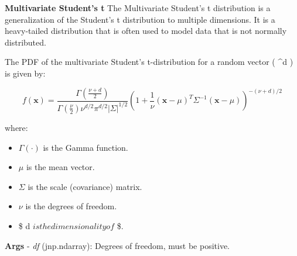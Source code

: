 \documentclass[
  letterpaper,
  DIV=11,
  numbers=noendperiod]{scrartcl}
\providecommand{\tightlist}{%
  \setlength{\itemsep}{0pt}\setlength{\parskip}{0pt}}\usepackage{longtable,booktabs,array}
\begin{document}
\textbf{Multivariate Student's t} The Multivariate Student's t
distribution is a generalization of the Student's t distribution to
multiple dimensions. It is a heavy-tailed distribution that is often
used to model data that is not normally distributed.

The PDF of the multivariate Student's t-distribution for a random vector
(  \in {}\^{}d ) is given by:

\[
  f(\mathbf{x}) = \frac{\Gamma\left(\frac{\nu + d}{2}\right)}{\Gamma\left(\frac{\nu}{2}\right) \nu^{d/2} \pi^{d/2} | \Sigma|^{1/2}} \left(1 + \frac{1}{\nu} (\mathbf{x} - \mu)^T \Sigma^{-1} (\mathbf{x} - \mu)\right)^{-(\nu + d)/2}
  \]

where:

\begin{itemize}
\tightlist
\item
  \(\Gamma(\cdot)\) is the Gamma function.
\item
  \(\mu\) is the mean vector.
\item
  \(\Sigma\) is the scale (covariance) matrix.
\item
  \(\nu\) is the degrees of freedom.
\item
  \$ d \(is the dimensionality of\)  \$.
\end{itemize}

\textbf{Args} - \emph{df} (jnp.ndarray): Degrees of freedom, must be
positive.
\end{document}
